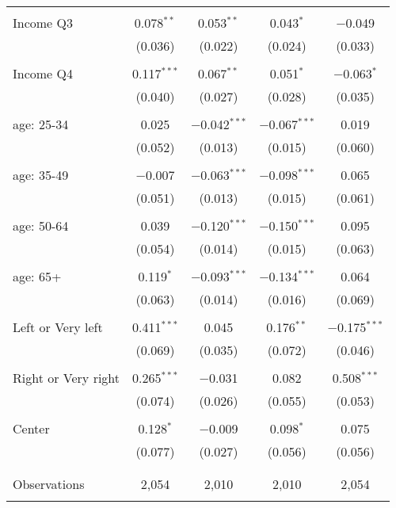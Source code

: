 \begin{tabular}{@{\extracolsep{5pt}}lcccc}
  & & & & \\ 
 Income Q3 & 0.078$^{**}$ & 0.053$^{**}$ & 0.043$^{*}$ & $-$0.049 \\ 
  & (0.036) & (0.022) & (0.024) & (0.033) \\ 
  & & & & \\ 
 Income Q4 & 0.117$^{***}$ & 0.067$^{**}$ & 0.051$^{*}$ & $-$0.063$^{*}$ \\ 
  & (0.040) & (0.027) & (0.028) & (0.035) \\ 
  & & & & \\ 
 age: 25-34 & 0.025 & $-$0.042$^{***}$ & $-$0.067$^{***}$ & 0.019 \\ 
  & (0.052) & (0.013) & (0.015) & (0.060) \\ 
  & & & & \\ 
 age: 35-49 & $-$0.007 & $-$0.063$^{***}$ & $-$0.098$^{***}$ & 0.065 \\ 
  & (0.051) & (0.013) & (0.015) & (0.061) \\ 
  & & & & \\ 
 age: 50-64 & 0.039 & $-$0.120$^{***}$ & $-$0.150$^{***}$ & 0.095 \\ 
  & (0.054) & (0.014) & (0.015) & (0.063) \\ 
  & & & & \\ 
 age: 65+ & 0.119$^{*}$ & $-$0.093$^{***}$ & $-$0.134$^{***}$ & 0.064 \\ 
  & (0.063) & (0.014) & (0.016) & (0.069) \\ 
  & & & & \\ 
 Left or Very left & 0.411$^{***}$ & 0.045 & 0.176$^{**}$ & $-$0.175$^{***}$ \\ 
  & (0.069) & (0.035) & (0.072) & (0.046) \\ 
  & & & & \\ 
 Right or Very right & 0.265$^{***}$ & $-$0.031 & 0.082 & 0.508$^{***}$ \\ 
  & (0.074) & (0.026) & (0.055) & (0.053) \\ 
  & & & & \\ 
 Center & 0.128$^{*}$ & $-$0.009 & 0.098$^{*}$ & 0.075 \\ 
  & (0.077) & (0.027) & (0.056) & (0.056) \\ 
  & & & & \\ 
\hline \\[-1.8ex] 

Observations & 2,054 & 2,010 & 2,010 & 2,054 \\ 
\hline 
\hline \\[-1.8ex] 
\end{tabular} 